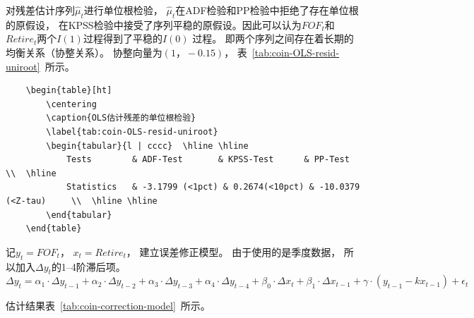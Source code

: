 对残差估计序列${\hat{\mu}_t}$进行单位根检验， ${\hat{\mu}_t}$在ADF检验和PP检验中拒绝了存在单位根的原假设， 在KPSS检验中接受了序列平稳的原假设。因此可以认为${FOF_t}$和${Retire_t}$两个$I(1)$过程得到了平稳的$I(0)$
过程。 即两个序列之间存在着长期的均衡关系（协整关系）。 协整向量为$(1， -0.15)$， 表~\ref{tab:coin-OLS-resid-uniroot}~所示。

\begin{lstlisting}
    \begin{table}[ht]
        \centering
        \caption{OLS估计残差的单位根检验}
        \label{tab:coin-OLS-resid-uniroot}
        \begin{tabular}{l | cccc}  \hline \hline
            Tests        & ADF-Test       & KPSS-Test      & PP-Test               \\  \hline
            Statistics   & -3.1799 (<1pct) & 0.2674(<10pct) & -10.0379 (<Z-tau)     \\  \hline \hline
        \end{tabular}
    \end{table}
\end{lstlisting}

记$y_t = FOF_t$， $x_t = Retire_t$， 建立误差修正模型。 由于使用的是季度数据， 所以加入$\Delta y_t$的1--4阶滞后项。
$$
\Delta y_t = \alpha_1 \cdot \Delta y_{t-1} + \alpha_2  \cdot \Delta  y_{t-2} + \alpha_3 \cdot \Delta  y_{t-3} + \alpha_4 \cdot \Delta  y_{t-4} + \beta_0 \cdot \Delta  x_t+\beta_1 \cdot \Delta  x_{t-1} + \gamma \cdot ( y_{t-1}-kx_{t-1}) + \epsilon_t
$$


估计结果表~\ref{tab:coin-correction-model}~所示。

